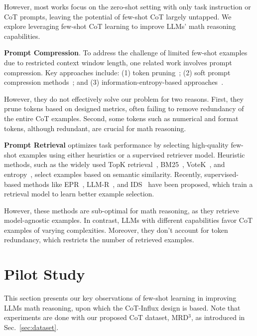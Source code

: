 However, most works focus on the zero-shot setting with only task instruction or CoT prompts,  leaving the potential of few-shot CoT largely untapped. We explore leveraging few-shot CoT learning to improve LLMs' math reasoning capabilities.

\textbf{Prompt Compression}. To address the challenge of limited few-shot examples due to restricted context window length, one related work involves prompt compression.  Key approaches  include:  (1) token pruning~\cite{ltp,top}; (2) soft prompt compression methods~\cite{wingate2022prompt,mu2023learning,chevalier2023adapting,ge2023context}; and (3) information-entropy-based approaches~\cite{li2023compressing,llmlingua}.

 However, they do not effectively solve our problem for two reasons. First, they prune tokens based on designed metrics, often failing to remove  redundancy of the entire CoT examples. Second, some tokens such as numerical and format tokens, although redundant, are crucial for math reasoning. 

\textbf{Prompt Retrieval} optimizes task performance by selecting high-quality few-shot examples using either heuristics or a supervised retriever model. Heuristic methods, such as the widely used TopK retrieval~\cite{topk, gao2021making}, BM25~\cite{robertson2009probabilistic}, VoteK~\cite{hongjin2022selective}, and entropy~\cite{lu2022fantastically}, select examples based on semantic similarity. Recently, supervised-based methods like  EPR~\cite{rubin2021learning}, LLM-R~\cite{wang2023learning}, and IDS~\cite{qin2023context} have been proposed, which train a retrieval model to learn better example selection.

However, these methods are sub-optimal for math reasoning, as they retrieve model-agnostic examples. In contrast, LLMs with different capabilities favor CoT examples of varying complexities. Moreover, they don't account for token redundancy, which restricts the number of retrieved examples. 

\section{Pilot Study}\label{sec:pilot_study}

This section presents our key observations of few-shot learning in improving LLMs math reasoning, upon which the {CoT-Influx} design is based. Note that experiments are done with our proposed CoT dataset, {MRD$^3$}, as introduced in Sec.~\ref{sec:dataset}.

